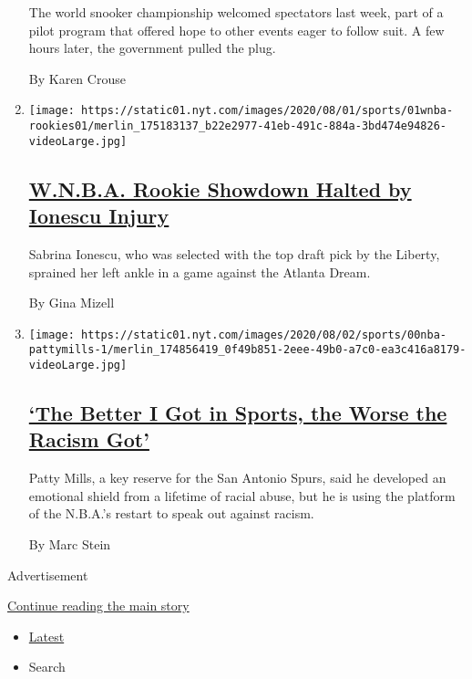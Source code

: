 \begin{enumerate}
  The world snooker championship welcomed spectators last week, part of
  a pilot program that offered hope to other events eager to follow
  suit. A few hours later, the government pulled the plug.

  By Karen Crouse
\item
  \texttt{[image: https://static01.nyt.com/images/2020/08/01/sports/01wnba-rookies01/merlin\_175183137\_b22e2977-41eb-491c-884a-3bd474e94826-videoLarge.jpg]}

  \hypertarget{wnba-rookie-showdown-halted-by-ionescu-injury}{%
  \subsection{\texorpdfstring{\href{/2020/08/01/sports/basketball/sabrina-ionescu-injury.html}{W.N.B.A.
  Rookie Showdown Halted by Ionescu
  Injury}}{W.N.B.A. Rookie Showdown Halted by Ionescu Injury}}\label{wnba-rookie-showdown-halted-by-ionescu-injury}}

  Sabrina Ionescu, who was selected with the top draft pick by the
  Liberty, sprained her left ankle in a game against the Atlanta Dream.

  By Gina Mizell
\item
  \texttt{[image: https://static01.nyt.com/images/2020/08/02/sports/00nba-pattymills-1/merlin\_174856419\_0f49b851-2eee-49b0-a7c0-ea3c416a8179-videoLarge.jpg]}

  \hypertarget{the-better-i-got-in-sports-the-worse-the-racism-got}{%
  \subsection{\texorpdfstring{\href{/2020/07/31/sports/basketball/spurs-patty-mills.html}{`The
  Better I Got in Sports, the Worse the Racism
  Got'}}{`The Better I Got in Sports, the Worse the Racism Got'}}\label{the-better-i-got-in-sports-the-worse-the-racism-got}}

  Patty Mills, a key reserve for the San Antonio Spurs, said he
  developed an emotional shield from a lifetime of racial abuse, but he
  is using the platform of the N.B.A.'s restart to speak out against
  racism.

  By Marc Stein
\end{enumerate}

Advertisement

\protect\hyperlink{after-mid1}{Continue reading the main story}

\begin{itemize}
\tightlist
\item
  \protect\hyperlink{stream-panel}{Latest}
\item
  Search
\end{itemize}

